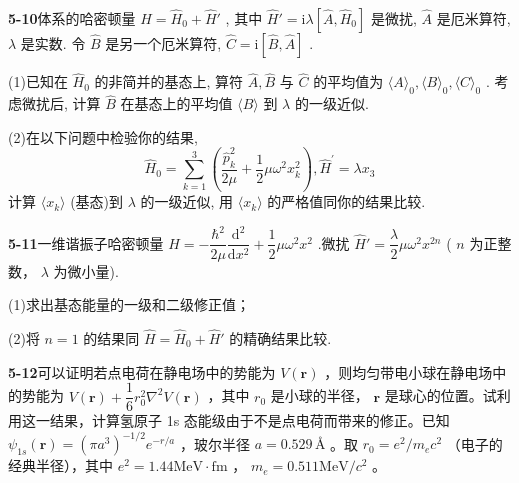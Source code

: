 \vfill

\newpage

\textbf{5-10}\quad 体系的哈密顿量 $\displaystyle \hat{H} = \hat{H}_0 + \hat{H}'$ , 其中 $\displaystyle \hat{H}' = \mathrm{i}\lambda[\hat{A}, \hat{H}_0]$ 是微扰, $\displaystyle \hat{A}$ 是厄米算符, $\displaystyle \lambda$ 是实数. 令 $\displaystyle \hat{B}$ 是另一个厄米算符, $\displaystyle \hat{C} = \mathrm{i}[\hat{B}, \hat{A}]$ .

(1)已知在 $\displaystyle \hat{H}_0$ 的非简并的基态上, 算符 $\displaystyle \hat{A}, \hat{B}$ 与 $\displaystyle \hat{C}$ 的平均值为 $\displaystyle \langle A \rangle_0, \langle B \rangle_0, \langle C \rangle_0$ . 考虑微扰后, 计算 $\displaystyle \hat{B}$ 在基态上的平均值 $\displaystyle \langle B \rangle$ 到 $\displaystyle \lambda$ 的一级近似.

(2)在以下问题中检验你的结果,
$$
\hat {H} _ {0} = \sum_ {k = 1} ^ {3} \left(\dfrac {\hat {p} _ {k} ^ {2}}{2 \mu} + \dfrac {1}{2} \mu \omega^ {2} x _ {k} ^ {2}\right), \hat {H} ^ {\prime} = \lambda x _ {3}
$$
计算 $\displaystyle \langle x_k\rangle$ (基态)到 $\displaystyle \lambda$ 的一级近似, 用 $\displaystyle \langle x_k\rangle$ 的严格值同你的结果比较.

\vfill

\newpage

\textbf{5-11}\quad 一维谐振子哈密顿量 $\displaystyle \hat{H} = -\dfrac{\hbar^2}{2\mu}\dfrac{\mathrm{d}^2}{\mathrm{d}x^2} +\dfrac{1}{2}\mu \omega^2 x^2$ .微扰 $\displaystyle \hat{H}' = \dfrac{\lambda}{2}\mu \omega^2 x^{2n}$ ( $\displaystyle n$ 为正整数， $\displaystyle \lambda$ 为微小量).

(1)求出基态能量的一级和二级修正值；

(2)将 $\displaystyle n = 1$ 的结果同 $\displaystyle \hat{H} = \hat{H}_0 + \hat{H}'$ 的精确结果比较.

\vfill

\newpage

\textbf{5-12}\quad 可以证明若点电荷在静电场中的势能为 $\displaystyle V(\pmb{r})$ ，则均匀带电小球在静电场中的势能为 $\displaystyle V(\pmb{r}) + \dfrac{1}{6} r_0^2 \nabla^2 V(\pmb{r})$ ，其中 $\displaystyle r_0$ 是小球的半径， $\displaystyle \pmb{r}$ 是球心的位置。试利用这一结果，计算氢原子 1s 态能级由于不是点电荷而带来的修正。已知 $\displaystyle \psi_{1s}(\pmb{r}) = \left(\pi a^3\right)^{-1/2} e^{-r/a}$ ，玻尔半径 $\displaystyle a = 0.529\,\text{\AA}$ 。取 $\displaystyle r_0 = e^2 / m_e c^2$ （电子的经典半径），其中 $\displaystyle e^2 = 1.44\mathrm{MeV} \cdot \mathrm{fm}$ ， $\displaystyle m_e = 0.511\mathrm{MeV} / c^2$ 。


